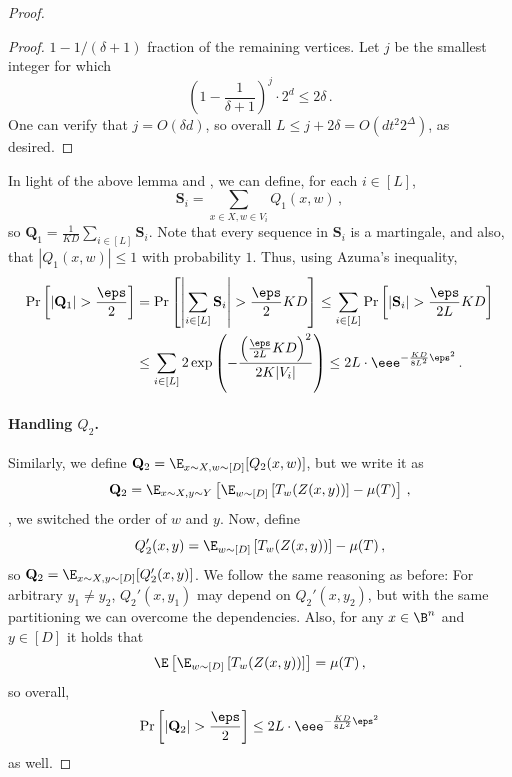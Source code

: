 \documentclass{toc}
\begin{document}
\begin{proof}
\begin{proof}
%
%
$1-1/(\delta+1)$
%
fraction of the remaining vertices.
Let $j$ be the smallest integer for which
\[
\left(1 - \frac{1}{\delta+1} \right)^{j} \cdot 2^{d} \le 2\delta\,.
\]
One can verify that $j = O(\delta d)$, so overall $L \le j+2\delta = O\left(dt^{2}2^{\Delta} \right)$, as desired.
\end{proof}
In light of the above lemma and , we can define, for each $i \in [L]$, 
\[\mathbf{S}_i = \sum_{x\in X,w \in V_i}Q_{1}(x,w)\,,\]
so $\mathbf{Q}_1 = \frac{1}{KD}\sum_{i \in [L]}\mathbf{S}_i$. Note that every sequence in
$\mathbf{S}_i$ is a martingale, and also, that $|Q_{1}(x,w)| \le 1$ with probability $1$. Thus,
using Azuma's inequality,
\begin{align}\label{eq:non-explicit1}
\Pr\left[\left|\mathbf{Q}_1\right| > \frac{\eps}{2}\right] &= \Pr\left[ \left|\sum_{i \in [L]}\mathbf{S}_i\right| > \frac{\eps}{2}KD \right] \le \sum_{i \in [L]}\Pr\left[\left|\mathbf{S}_i\right| > \frac{\eps}{2L}KD\right] \nonumber \\
&\le \sum_{i \in [L]} 2\exp\left( -\frac{\left(\frac{\eps}{2L}KD\right)^2}{2K|V_i|} \right) \le 
2L \cdot \eee^{-\frac{KD}{8L^2}\eps^2}\,.
\end{align}

\paragraph*{Handling $Q_2$.} Similarly, we define
$\mathbf{Q}_2 = \E_{x \sim X,w \sim [D]}[Q_{2}(x,w)]$, but we write it
as 
\[
\mathbf{Q}_2 = \E_{x \sim X,y \sim Y}\left[\E_{w \sim [D]}\left[ T_{w}(Z(x,y)) \right] - \mu(T)\right]\,,
\]
\ie, we switched the order of $w$ and $y$. Now, define
\[
Q_{2}'(x,y) = \E_{w \sim [D]}\left[ T_{w}(Z(x,y)) \right] - \mu(T)\,,
\]
so $\mathbf{Q}_2 = \E_{x \sim X,y \sim [D]}[Q'_{2}(x,y)]$. We follow the same reasoning as before:
For arbitrary $y_1 \neq y_2$, $Q_{2}'(x,y_1)$ may depend on $Q_{2}'(x,y_2)$, but with the same
partitioning we can overcome the dependencies. Also, for any $x \in \B^n$ and $y \in [D]$ 
it holds that
\[
\E\left[ \E_{w \sim [D]}\left[ T_{w}(Z(x,y)) \right] \right] = \mu(T)\,,
\]
so overall,
\begin{equation}\label{eq:non-explicit2}
\Pr\left[\left|\mathbf{Q}_2\right| > \frac{\eps}{2}\right] \le 2L \cdot \eee^{-\frac{KD}{8L^2}\eps^2}
\end{equation}
as well.

%

\end{proof}
\end{document}
